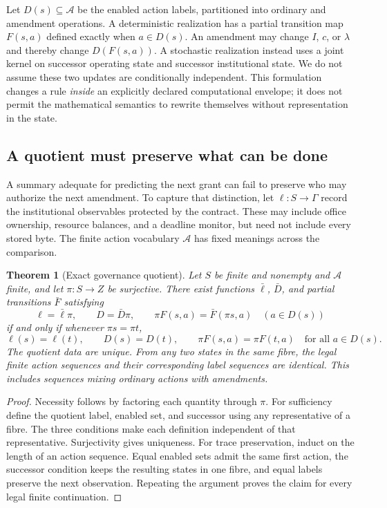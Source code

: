 \documentclass[11pt,letterpaper]{article}
\theoremstyle{plain}
\newtheorem{theorem}[proposition]{Theorem}
\theoremstyle{definition}
\theoremstyle{remark}
\begin{document}
Let $D(s)\subseteq\mathcal A$ be the enabled action labels, partitioned into ordinary and amendment operations. A deterministic realization has a partial transition map $F(s,a)$ defined exactly when $a\in D(s)$. An amendment may change $I$, $c$, or $\lambda$ and thereby change $D(F(s,a))$. A stochastic realization instead uses a joint kernel on successor operating state and successor institutional state. We do not assume these two updates are conditionally independent. This formulation changes a rule \emph{inside} an explicitly declared computational envelope; it does not permit the mathematical semantics to rewrite themselves without representation in the state.

\subsection{A quotient must preserve what can be done}
A summary adequate for predicting the next grant can fail to preserve who may authorize the next amendment. To capture that distinction, let $\ell:S\to\Gamma$ record the institutional observables protected by the contract. These may include office ownership, resource balances, and a deadline monitor, but need not include every stored byte. The finite action vocabulary $\mathcal A$ has fixed meanings across the comparison.

\begin{theorem}[Exact governance quotient]\label{thm:govquot}
Let $S$ be finite and nonempty and $\mathcal A$ finite, and let $\pi:S\to Z$ be surjective. There exist functions $\bar\ell$, $\bar D$, and partial transitions $\bar F$ satisfying
\[
\ell=\bar\ell\pi,\qquad D=\bar D\pi,\qquad
\pi F(s,a)=\bar F(\pi s,a)\quad(a\in D(s))
\]
if and only if whenever $\pi s=\pi t$,
\[
\ell(s)=\ell(t),\qquad D(s)=D(t),\qquad
\pi F(s,a)=\pi F(t,a)\quad\text{for all }a\in D(s).
\]
The quotient data are unique. From any two states in the same fibre, the legal finite action sequences and their corresponding label sequences are identical. This includes sequences mixing ordinary actions with amendments.
\end{theorem}
\begin{proof}
Necessity follows by factoring each quantity through $\pi$. For sufficiency define the quotient label, enabled set, and successor using any representative of a fibre. The three conditions make each definition independent of that representative. Surjectivity gives uniqueness. For trace preservation, induct on the length of an action sequence. Equal enabled sets admit the same first action, the successor condition keeps the resulting states in one fibre, and equal labels preserve the next observation. Repeating the argument proves the claim for every legal finite continuation.
\end{proof}
\end{document}
